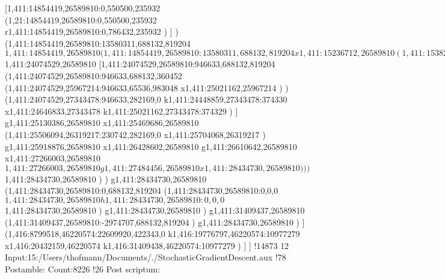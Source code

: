 {[1,411:14854419,26589810:0,550500,235932
(1,21:14854419,26589810:0,550500,235932
r1,411:14854419,26589810:0,786432,235932
)
]
)
(1,411:14854419,26589810:13580311,688132,819204
$1,411:14854419,26589810
(1,411:14854419,26589810:13580311,688132,819204
x1,411:15236712,26589810
(1,411:15382348,26319217:230742,282169,0
x1,411:15580322,26319217
)
(1,411:15613090,26589810:12821640,688132,819204
(1,411:15613090,26589810:12821640,688132,819204
g1,411:15831543,26589810
x1,411:16814585,26589810
x1,411:17142266,26589810
x1,411:18549470,26589810
g1,411:18767923,26589810
x1,411:20664831,26589810
g1,411:20883284,26589810
x1,411:22581762,26589810
g1,411:22800215,26589810
x1,411:23856076,26589810
g1,411:24074529,26589810
$1,411:24074529,26589810
[1,411:24074529,26589810:946633,688132,819204
(1,411:24074529,26589810:946633,688132,360452
(1,411:24074529,25967214:946633,65536,983048
x1,411:25021162,25967214
)
)
(1,411:24074529,27343478:946633,282169,0
k1,411:24448859,27343478:374330
x1,411:24646833,27343478
k1,411:25021162,27343478:374329
)
]
g1,411:25130386,26589810
x1,411:25469686,26589810
(1,411:25506094,26319217:230742,282169,0
x1,411:25704068,26319217
)
g1,411:25918876,26589810
x1,411:26428602,26589810
g1,411:26610642,26589810
x1,411:27266003,26589810
$1,411:27266003,26589810
g1,411:27484456,26589810
x1,411:28434730,26589810
)
)
)
$1,411:28434730,26589810
)
)
g1,411:28434730,26589810
(1,411:28434730,26589810:0,688132,819204
(1,411:28434730,26589810:0,0,0
$1,411:28434730,26589810
h1,411:28434730,26589810:0,0,0
$1,411:28434730,26589810
)
g1,411:28434730,26589810
)
g1,411:31409437,26589810
(1,411:31409437,26589810:-2974707,688132,819204
)
g1,411:28434730,26589810
)
]
(1,416:8799518,46220574:22609920,422343,0
k1,416:19776797,46220574:10977279
x1,416:20432159,46220574
k1,416:31409438,46220574:10977279
)
]
]
!14873
}12
Input:15:/Users/thofmann/Documents/./StochasticGradientDescent.aux
!78
Postamble:
Count:8226
!26
Post scriptum:
